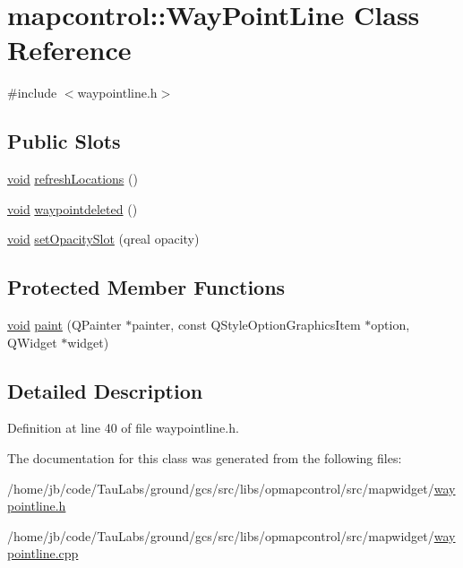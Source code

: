 \hypertarget{classmapcontrol_1_1_way_point_line}{\section{mapcontrol\-:\-:\-Way\-Point\-Line \-Class \-Reference}
\label{classmapcontrol_1_1_way_point_line}
}


{\ttfamily \#include $<$waypointline.\-h$>$}

\subsection*{\-Public \-Slots}
\begin{DoxyCompactItemize}
\item 
\hyperlink{group___u_a_v_objects_plugin_ga444cf2ff3f0ecbe028adce838d373f5c}{void} \hyperlink{group___o_p_map_widget_ga172c303dfa7505c919d0a6dab7cb5bc1}{refresh\-Locations} ()
\item 
\hyperlink{group___u_a_v_objects_plugin_ga444cf2ff3f0ecbe028adce838d373f5c}{void} \hyperlink{group___o_p_map_widget_ga507019eb072fcd6904290dadf39a11ef}{waypointdeleted} ()
\item 
\hyperlink{group___u_a_v_objects_plugin_ga444cf2ff3f0ecbe028adce838d373f5c}{void} \hyperlink{group___o_p_map_widget_ga352adc3521d31339f2693ad55de5e1d7}{set\-Opacity\-Slot} (qreal opacity)
\end{DoxyCompactItemize}
\subsection*{\-Protected \-Member \-Functions}
\begin{DoxyCompactItemize}
\item 
\hyperlink{group___u_a_v_objects_plugin_ga444cf2ff3f0ecbe028adce838d373f5c}{void} \hyperlink{group___o_p_map_widget_ga7e02fb7136fabae7e6ffe0e8db29e747}{paint} (\-Q\-Painter $\ast$painter, const \-Q\-Style\-Option\-Graphics\-Item $\ast$option, \-Q\-Widget $\ast$widget)
\end{DoxyCompactItemize}


\subsection{\-Detailed \-Description}


\-Definition at line 40 of file waypointline.\-h.



\-The documentation for this class was generated from the following files\-:\begin{DoxyCompactItemize}
\item 
/home/jb/code/\-Tau\-Labs/ground/gcs/src/libs/opmapcontrol/src/mapwidget/\hyperlink{waypointline_8h}{waypointline.\-h}\item 
/home/jb/code/\-Tau\-Labs/ground/gcs/src/libs/opmapcontrol/src/mapwidget/\hyperlink{waypointline_8cpp}{waypointline.\-cpp}\end{DoxyCompactItemize}
